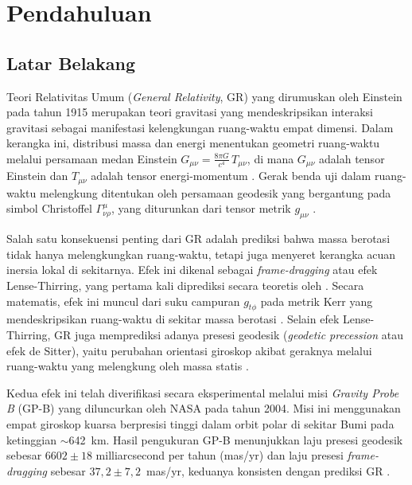 
\chapter{Pendahuluan}
\label{chap:pendahuluan}

\section{Latar Belakang}
\label{sec:latar-belakang}

Teori Relativitas Umum (\textit{General Relativity}, GR) yang dirumuskan oleh Einstein pada tahun 1915 merupakan teori gravitasi yang mendeskripsikan interaksi gravitasi sebagai manifestasi kelengkungan ruang-waktu empat dimensi. Dalam kerangka ini, distribusi massa dan energi menentukan geometri ruang-waktu melalui persamaan medan Einstein $G_{\mu\nu} = \frac{8\pi G}{c^4}\, T_{\mu\nu}$, di mana $G_{\mu\nu}$ adalah tensor Einstein dan $T_{\mu\nu}$ adalah tensor energi-momentum \parencite{Einstein1916GR, Misner1973Gravitation}. Gerak benda uji dalam ruang-waktu melengkung ditentukan oleh persamaan geodesik yang bergantung pada simbol Christoffel $\Gamma^\mu_{\nu\rho}$, yang diturunkan dari tensor metrik $g_{\mu\nu}$ \parencite{Carroll2004SpacetimeGeometry}.

Salah satu konsekuensi penting dari GR adalah prediksi bahwa massa berotasi tidak hanya melengkungkan ruang-waktu, tetapi juga menyeret kerangka acuan inersia lokal di sekitarnya. Efek ini dikenal sebagai \textit{frame-dragging} atau efek Lense-Thirring, yang pertama kali diprediksi secara teoretis oleh \textcite{Lense1918LenseThirring}. Secara matematis, efek ini muncul dari suku campuran $g_{t\phi}$ pada metrik Kerr yang mendeskripsikan ruang-waktu di sekitar massa berotasi \parencite{Kerr1963KerrMetric}. Selain efek Lense-Thirring, GR juga memprediksi adanya presesi geodesik (\textit{geodetic precession} atau efek de Sitter), yaitu perubahan orientasi giroskop akibat geraknya melalui ruang-waktu yang melengkung oleh massa statis \parencite{Carroll2004SpacetimeGeometry, Will2014Confrontation}.

Kedua efek ini telah diverifikasi secara eksperimental melalui misi \textit{Gravity Probe B} (GP-B) yang diluncurkan oleh NASA pada tahun 2004. Misi ini menggunakan empat giroskop kuarsa berpresisi tinggi dalam orbit polar di sekitar Bumi pada ketinggian $\sim$642~km. Hasil pengukuran GP-B menunjukkan laju presesi geodesik sebesar $6602 \pm 18$ milliarcsecond per tahun (mas/yr) dan laju presesi \textit{frame-dragging} sebesar $37{,}2 \pm 7{,}2$~mas/yr, keduanya konsisten dengan prediksi GR \parencite{Everitt2011GravityProbeB}.

